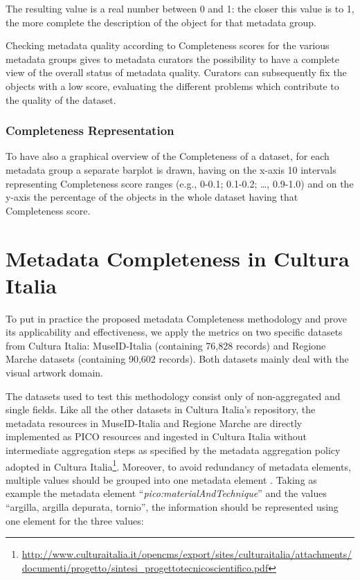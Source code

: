 \documentclass[epsfig,a4paper,12pt,titlepage]{book}
\begin{document}
The resulting value is a real number between 0 and 1: the closer this value is to 1, the more complete the description of the object for that metadata group. 

Checking metadata quality according to Completeness scores for the various metadata groups  gives to metadata curators the possibility to have a complete view of the overall status of metadata quality. Curators can subsequently fix the objects with a low score, evaluating the different problems which contribute to the quality of the dataset.
\subsubsection{Completeness Representation}

To have also a graphical overview of the Completeness of a dataset, for each metadata group a separate barplot is drawn, having on the x-axis 10 intervals representing Completeness score ranges (e.g., 0-0.1; 0.1-0.2; \dots, 0.9-1.0) and on the y-axis the percentage of the objects in the whole dataset having that Completeness score.


\section{Metadata Completeness in Cultura Italia}
\label{sec:compci}

To put in practice the proposed metadata Completeness methodology and prove its applicability and effectiveness, we apply the metrics on two specific datasets from Cultura Italia: MuseID-Italia (containing 76,828 records) and Regione Marche datasets (containing 90,602 records). Both datasets mainly deal with the visual artwork domain.

The datasets used to test this methodology consist only of non-aggregated and single fields. Like all the other datasets in Cultura Italia's repository, the metadata resources in MuseID-Italia and Regione Marche are directly implemented as PICO resources and ingested in Cultura Italia without intermediate aggregation steps as specified by the metadata aggregation policy adopted in Cultura Italia\footnote{\url{http://www.culturaitalia.it/opencms/export/sites/culturaitalia/attachments/documenti/progetto/sintesi_progettotecnicoscientifico.pdf}}. Moreover, to avoid redundancy of metadata elements,  multiple values should be grouped into one metadata element \cite{merlo}. Taking as example the metadata element ``\textit{pico:materialAndTechnique}'' and the values ``argilla, argilla depurata, tornio'', the information should be represented using one element for the three values: 
\end{document}
